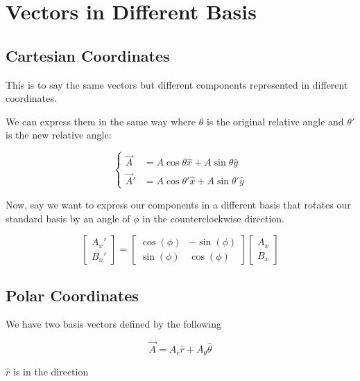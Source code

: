 \section{Vectors in Different Basis}

\subsection{Cartesian Coordinates}

This is to say the same vectors but different components represented in different coordinates.

We can express them in the same way where $\theta$ is the original relative angle and $\theta'$ is the new relative angle:

\begin{equation}
	\begin{cases}
		\vec A &= A\cos\theta\hat x + A\sin\theta\hat y\\
		\vec A' &= A\cos\theta'\hat x + A\sin\theta'\hat y
	\end{cases}
\end{equation}

Now, say we want to express our components in a different basis that rotates our standard basis by an angle of $\phi$ in the counterclockwise direction.

\begin{equation}
	\begin{bmatrix}
		A_x'\\B_x'
	\end{bmatrix} = \begin{bmatrix}
		\cos(\phi) & -\sin(\phi)\\
		\sin(\phi) & \cos(\phi)
	\end{bmatrix} \begin{bmatrix}
		A_x\\B_x
	\end{bmatrix}
\end{equation}

\subsection{Polar Coordinates}

We have two basis vectors defined by the following

\begin{equation}
	\vec A = A_r \hat r + A_\theta \hat \theta
\end{equation}

$\hat r$ is in the direction 

